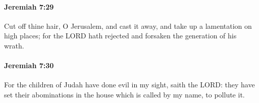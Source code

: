 		\paragraph{Jeremiah 7:29} %
			\label{JEREMIAH-7-29}

			Cut off thine hair, O Jerusalem, and cast it away, and take up a lamentation on high places; for the LORD hath rejected and forsaken the generation of his wrath.


		\paragraph{Jeremiah 7:30} %
			\label{JEREMIAH-7-30}

			For the children of Judah have done evil in my sight, saith the LORD: they have set their abominations in the house which is called by my name, to pollute it.


